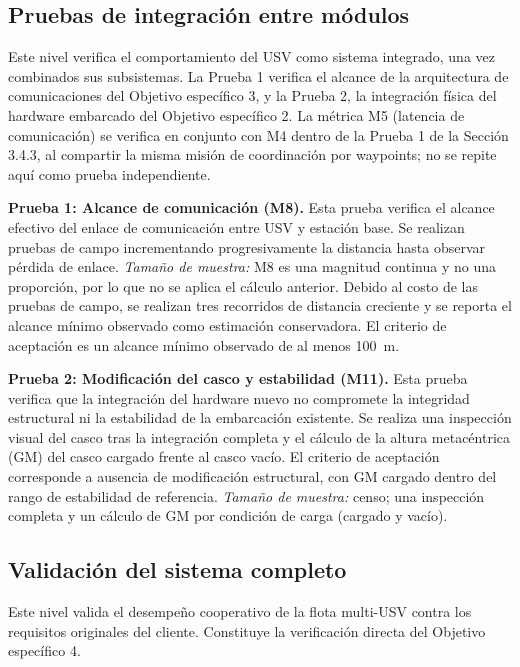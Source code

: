 \subsection{Pruebas de integración entre módulos}
\label{subsec:pruebas_integracion}

Este nivel verifica el comportamiento del USV como sistema integrado, una vez combinados
sus subsistemas. La Prueba 1 verifica el alcance de la arquitectura de comunicaciones del 
Objetivo específico 3, y la Prueba 2, la integración física del hardware embarcado del Objetivo específico 2. 
La métrica M5 (latencia de comunicación) se verifica en conjunto con M4 dentro de la Prueba 1 de la
Sección 3.4.3, al compartir la misma misión de coordinación por waypoints; no se repite aquí
como prueba independiente.

\textbf{Prueba 1: Alcance de comunicación (M8).} Esta prueba verifica el alcance efectivo
del enlace de comunicación entre USV y estación base. Se realizan pruebas de campo
incrementando progresivamente la distancia hasta observar pérdida de enlace.
\emph{Tamaño de muestra:} M8 es una magnitud continua y no una proporción, por lo que no se
aplica el cálculo anterior. Debido al costo de las pruebas de campo, se realizan tres
recorridos de distancia creciente y se reporta el alcance mínimo observado como estimación
conservadora. El criterio de aceptación es un alcance mínimo observado de al menos 100~m.

\textbf{Prueba 2: Modificación del casco y estabilidad (M11).} Esta prueba verifica que la
integración del hardware nuevo no compromete la integridad estructural ni la estabilidad de
la embarcación existente. Se realiza una inspección visual del casco tras la integración
completa y el cálculo de la altura metacéntrica (GM) del casco cargado frente al casco
vacío. El criterio de aceptación corresponde a ausencia de modificación estructural, con GM
cargado dentro del rango de estabilidad de referencia. \emph{Tamaño de muestra:} censo; una
inspección completa y un cálculo de GM por condición de carga (cargado y vacío).

\newpage

\subsection{Validación del sistema completo}
\label{subsec:pruebas_sistema}

Este nivel valida el desempeño cooperativo de la flota multi-USV contra los requisitos
originales del cliente. Constituye la verificación directa del Objetivo específico 4.

